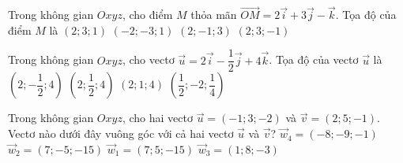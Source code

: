 \begin{ex}%
Trong không gian $Oxyz$, cho điểm $M$ thỏa mãn $\overrightarrow{OM}=2\overrightarrow{i}+3\overrightarrow{j}-\overrightarrow{k}$. Tọa độ của điểm $M$ là
\choice
{$(2;3;1)$}
{$(-2;-3;1)$}
{$(2;-1;3)$}
{\True $(2;3;-1)$}
\end{ex}

\begin{ex}%
Trong không gian $Oxyz$, cho vectơ $\overrightarrow{u}=2\overrightarrow{i}-\dfrac{1}{2}\overrightarrow{j}+4\overrightarrow{k}$. Tọa độ của vectơ $\overrightarrow{u}$ là
\choice
{\True $\left(2;-\dfrac{1}{2};4 \right)$}
{$\left(2;\dfrac{1}{2};4 \right)$}
{$(2;1;4)$}
{$\left(\dfrac{1}{2};-2;\dfrac{1}{4} \right)$}
\end{ex}

\begin{ex}%
Trong không gian $Oxyz$, cho hai vectơ $\overrightarrow{u}=(-1;3;-2)$ và $\overrightarrow{v}=(2;5;-1)$. Vectơ nào dưới đây vuông góc với cả hai vectơ $\overrightarrow{u}$ và $\overrightarrow{v}$?
\choice
{${\overrightarrow{w}_4}=(-8;-9;-1)$}
{\True ${\overrightarrow{w}_2}=(7;-5;-15)$}
{${\overrightarrow{w}_1}=(7;5;-15)$}
{${\overrightarrow{w}_3}=(1;8;-3)$}
\end{ex}

